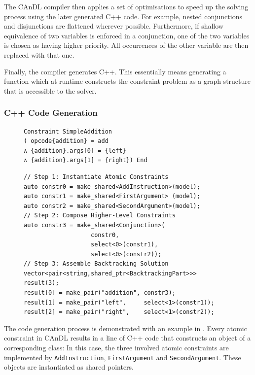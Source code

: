     The CAnDL compiler then applies a set of optimisations to speed up the
    solving process using the later generated C++ code.
    For example, nested conjunctions and disjunctions are flattened wherever
    possible.
    Furthermore, if shallow equivalence of two variables is enforced in a
    conjunction, one of the two variables is chosen as having higher priority.
    All occurrences of the other variable are then replaced with that one.

    Finally, the compiler generates C++.
    This essentially means generating a function which at runtime constructs
    the constraint problem as a graph structure that is accessible to the
    solver.

\subsubsection{C++ Code Generation}

\begin{figure}[t]
\centering
\begin{lstlisting}[language=CAnDL]
Constraint SimpleAddition
( opcode{addition} = add
∧ {addition}.args[0] = {left}
∧ {addition}.args[1] = {right}) End
\end{lstlisting}
\begin{lstlisting}[language=MyCpp,label={fig:codegen},caption=
   {C++ code generation: The code is generated to first instantiate atomic
    constraints, then compose higher-level constructs and finally assemble a
    backtracking solution for the solver.\parfillskip=0pt}]
// Step 1: Instantiate Atomic Constraints
auto constr0 = make_shared<AddInstruction>(model);
auto constr1 = make_shared<FirstArgument> (model);
auto constr2 = make_shared<SecondArgument>(model);
// Step 2: Compose Higher-Level Constraints
auto constr3 = make_shared<Conjunction>(
                   constr0,
                   select<0>(constr1),
                   select<0>(constr2));
// Step 3: Assemble Backtracking Solution
vector<pair<string,shared_ptr<BacktrackingPart>>> result(3);
result[0] = make_pair("addition", constr3);
result[1] = make_pair("left",     select<1>(constr1));
result[2] = make_pair("right",    select<1>(constr2));
\end{lstlisting}
\end{figure}

    The code generation process is demonstrated with an example in
    .
    Every atomic constraint in CAnDL results in a line of C++ code that
    constructs an object of a corresponding class:
    In this case, the three involved atomic constraints are implemented by
    \texttt{AddInstruction}, \texttt{FirstArgument} and \texttt{SecondArgument}.
    These objects are instantiated as shared pointers.

